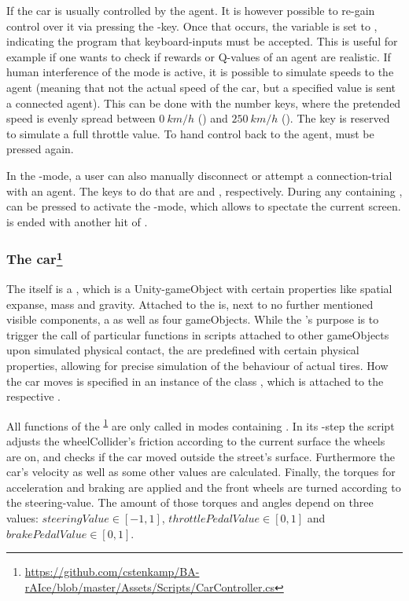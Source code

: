 If  the car is usually controlled by the agent. It is however possible to re-gain control over it via pressing the -key. Once that occurs, the variable  is set to , indicating the program that keyboard-inputs must be accepted. This is useful for example if one wants to check if rewards or Q-values of an agent are realistic. If human interference of the  mode is active, it is possible to simulate speeds to the agent (meaning that not the actual speed of the car, but a specified value is sent a connected agent). This can be done with the number keys, where the pretended speed is evenly spread between $0~ km/h$ () and $250~ km/h$ (). The  key is reserved to simulate a full throttle value. To hand control back to the agent,  must be pressed again. 

In the -mode, a user can also manually disconnect or attempt a connection-trial with an agent. The keys to do that are  and , respectively. During any  containing ,  can be pressed to activate the -mode, which allows to spectate the current screen.  is ended with another hit of . 

\subsubsection{The car\footnote{\label{fn:car}\url{https://github.com/cstenkamp/BA-rAIce/blob/master/Assets/Scripts/CarController.cs}}}

The  itself is a , which is a Unity-gameObject with certain properties like spatial expanse, mass and gravity. Attached to the  is, next to no further mentioned visible components, a  as well as four  gameObjects. While the 's purpose is to trigger the call of particular functions in scripts attached to other gameObjects upon simulated physical contact, the  are predefined with certain physical properties, allowing for precise simulation of the behaviour of actual tires. How the car moves is specified in an instance of the class , which is attached to the respective .

All functions of the \textsuperscript{\ref{fn:car}} are only called in modes containing . In its -step the script adjusts the wheelCollider's friction according to the current surface the wheels are on, and checks if the car moved outside the street's surface. Furthermore the car's velocity as well as some other values are calculated. Finally, the torques for acceleration and braking are applied and the front wheels are turned according to the steering-value. The amount of those torques and angles depend on three values: $steeringValue \in [-1,1]$, $throttlePedalValue \in [0,1]$ and $brakePedalValue \in [0,1]$. 

